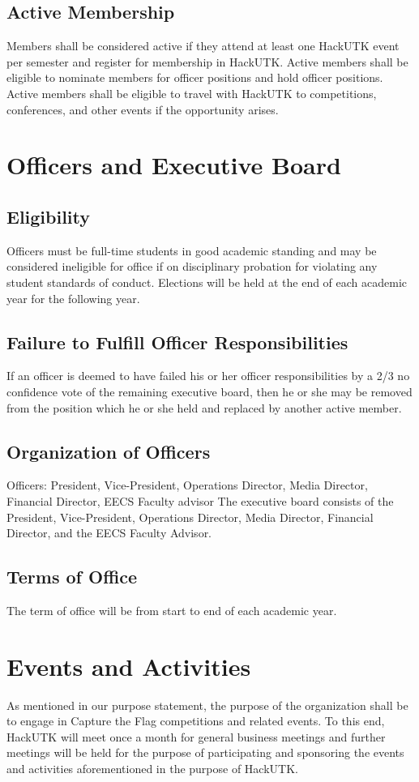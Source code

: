 \documentclass[12pt]{article}
\begin{document}
\subsection{Active Membership}
Members shall be considered active if they attend at least one HackUTK event per semester and register for membership in HackUTK. Active members shall be eligible to nominate members for officer positions and hold officer positions. Active members shall be eligible to travel with HackUTK to competitions, conferences, and other events if the opportunity arises. 

\section{Officers and Executive Board}
\subsection{Eligibility}
Officers must be full-time students in good academic standing and may be considered ineligible for office if on disciplinary probation for violating any student standards of conduct. Elections will be held at the end of each academic year for the following year.

\subsection{Failure to Fulfill Officer Responsibilities}
If an officer is deemed to have failed his or her officer responsibilities by a 2/3 no confidence vote of the remaining executive board, then he or she may be removed from the position which he or she held and replaced by another active member.

\subsection{Organization of Officers}
Officers: President, Vice-President, Operations Director, Media Director, Financial Director, EECS Faculty advisor
The executive board consists of the President, Vice-President, Operations Director, Media Director, Financial Director, and the EECS Faculty Advisor.

\subsection{Terms of Office}
The term of office will be from start to end of each academic year.

\section{Events and Activities}
As mentioned in our purpose statement, the purpose of the organization shall be to engage in Capture the Flag competitions and related events. To this end, HackUTK will meet once a month for general business meetings and further meetings will be held for the purpose of participating and sponsoring the events and activities aforementioned in the purpose of HackUTK.
\end{document}
